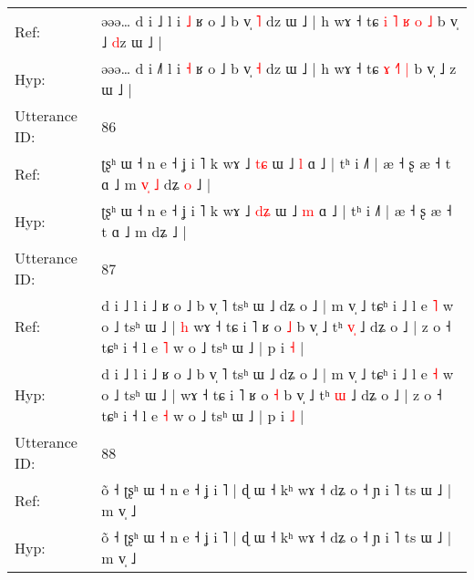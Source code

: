 \documentclass[10pt]{article}
\DeclareRobustCommand{\hl}[1]{{\textcolor{red}{#1}}}
\begin{document}
\begin{longtable}{ll}
Ref: & əəə… d i ˩\hl{} l i \hl{˩} ʁ o ˩ b v̩ \hl{˥} dz ɯ ˩ | h wɤ ˧ tɕ\hl{ }\hl{i} \hl{˥} \hl{ʁ}\hl{ }\hl{o} \hl{˩} b v̩ ˩ \hl{d}z ɯ ˩ |
 \\
Hyp: & əəə… d i ˩\hl{˥} l i \hl{˧} ʁ o ˩ b v̩ \hl{˧} dz ɯ ˩ | h wɤ ˧ tɕ\hl{}\hl{} \hl{ɤ} \hl{}\hl{˧}\hl{˥} \hl{|} b v̩ ˩ \hl{}z ɯ ˩ |
 \\
\midrule
Utterance ID: & 86 \\
Ref: & ʈʂʰ ɯ ˧ n e ˧ ʝ i ˥ k wɤ ˩ \hl{t}\hl{ɕ} ɯ ˩ \hl{l} ɑ ˩ | tʰ i ˩˥ | æ ˧ ʂ æ ˧ t ɑ ˩ m\hl{ }\hl{v}\hl{̩}\hl{ }\hl{˩} dʑ\hl{ }\hl{o} ˩ |
 \\
Hyp: & ʈʂʰ ɯ ˧ n e ˧ ʝ i ˥ k wɤ ˩ \hl{d}\hl{ʑ} ɯ ˩ \hl{m} ɑ ˩ | tʰ i ˩˥ | æ ˧ ʂ æ ˧ t ɑ ˩ m\hl{}\hl{}\hl{}\hl{}\hl{} dʑ\hl{}\hl{} ˩ |
 \\
\midrule
Utterance ID: & 87 \\
Ref: & d i ˩ l i ˩ ʁ o ˩ b v̩ ˥ tsʰ ɯ ˩ dʑ o ˩ | m v̩ ˩ tɕʰ i ˩ l e \hl{˥} w o ˩ tsʰ ɯ ˩ |\hl{ }\hl{h} wɤ ˧ tɕ i ˥ ʁ o \hl{˩} b v̩ ˩ tʰ \hl{v}\hl{̩} ˩ dʑ o ˩ | z o ˧ tɕʰ i ˧ l e \hl{˥} w o ˩ tsʰ ɯ ˩ | p i \hl{˧} |
 \\
Hyp: & d i ˩ l i ˩ ʁ o ˩ b v̩ ˥ tsʰ ɯ ˩ dʑ o ˩ | m v̩ ˩ tɕʰ i ˩ l e \hl{˧} w o ˩ tsʰ ɯ ˩ |\hl{}\hl{} wɤ ˧ tɕ i ˥ ʁ o \hl{˧} b v̩ ˩ tʰ \hl{}\hl{ɯ} ˩ dʑ o ˩ | z o ˧ tɕʰ i ˧ l e \hl{˧} w o ˩ tsʰ ɯ ˩ | p i \hl{˩} |
 \\
\midrule
Utterance ID: & 88 \\
Ref: & õ ˧ ʈʂʰ ɯ ˧ n e ˧ ʝ i ˥ | ɖ ɯ ˧ kʰ wɤ ˧ dʑ o ˧ ɲ i ˥ ts ɯ ˩ | m v̩ ˩
 \\
Hyp: & õ ˧ ʈʂʰ ɯ ˧ n e ˧ ʝ i ˥ | ɖ ɯ ˧ kʰ wɤ ˧ dʑ o ˧ ɲ i ˥ ts ɯ ˩ | m v̩ ˩
 \\
\midrule
\end{longtable}
\end{document}
